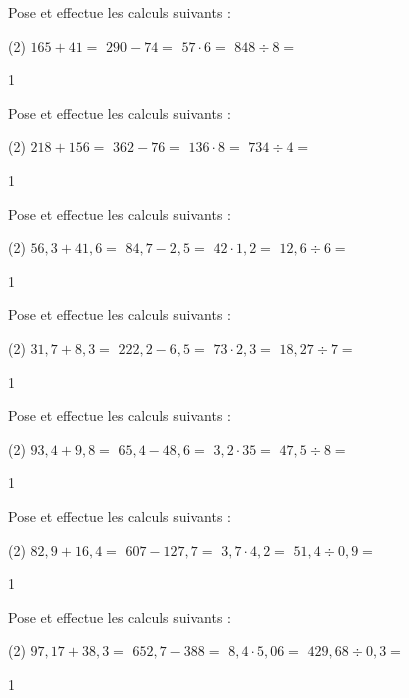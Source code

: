 \documentclass[a4paper,11pt]{report}
\begin{document}
\begin{exo}{
Pose et effectue les calculs suivants :
\begin{tasks}[after-item-skip = 0.4em, after-skip=-0.5em](2)
\task $165+41 =$
\task $290-74=$
\task $57\cdot 6 =$
\task $848 \div 8 =$
\end{tasks}
}{1}\end{exo}

\begin{exo}{
Pose et effectue les calculs suivants :
\begin{tasks}[after-item-skip = 0.4em, after-skip=-0.5em](2)
\task $218+156 =$
\task $362-76=$
\task $136\cdot 8 =$
\task $734 \div 4 =$
\end{tasks}
}{1}\end{exo}


\begin{exo}{
Pose et effectue les calculs suivants :
\begin{tasks}[after-item-skip = 0.4em, after-skip=-0.5em](2)
\task $56,3+41,6 =$
\task $84,7-2,5=$
\task $42\cdot 1,2 =$
\task $12,6 \div 6 =$
\end{tasks}
}{1}\end{exo}

\begin{exo}{
Pose et effectue les calculs suivants :
\begin{tasks}[after-item-skip = 0.4em, after-skip=-0.5em](2)
\task $31,7+8,3 =$
\task $222,2-6,5=$
\task $73\cdot 2,3 =$
\task $18,27 \div 7 =$
\end{tasks}
}{1}\end{exo}

\begin{exo}{
Pose et effectue les calculs suivants :
\begin{tasks}[after-item-skip = 0.4em, after-skip=-0.5em](2)
\task $93,4+9,8 =$
\task $65,4 -48,6=$
\task $3,2\cdot 35 =$
\task $47,5 \div 8 =$
\end{tasks}
}{1}\end{exo}

\begin{exo}{
Pose et effectue les calculs suivants :
\begin{tasks}[after-item-skip = 0.4em, after-skip=-0.5em](2)
\task $82,9+16,4 =$
\task $607-127,7=$
\task $3,7\cdot 4,2 =$
\task $51,4 \div 0,9 =$
\end{tasks}
}{1}\end{exo}

\begin{exo}{
Pose et effectue les calculs suivants :
\begin{tasks}[after-item-skip = 0.4em, after-skip=-0.5em](2)
\task $97,17+38,3 =$
\task $652,7-388=$
\task $8,4\cdot 5,06 =$
\task $429,68 \div 0,3 =$
\end{tasks}
}{1}\end{exo}
\end{document}
